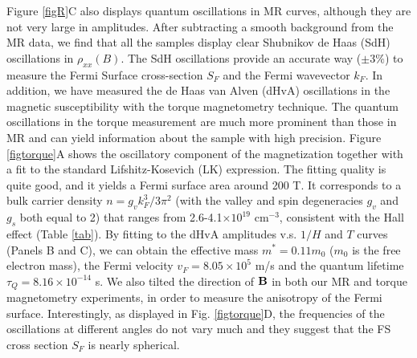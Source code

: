 Figure \ref{figR}C also displays quantum oscillations in MR curves, although they are not very large in amplitudes. After subtracting a smooth background from the MR data, we find that all the samples display clear Shubnikov de Haas (SdH) oscillations in $\rho_{xx}(B)$. The SdH oscillations provide an accurate way ($\pm3\%$) to measure the Fermi Surface cross-section $S_F$ and the Fermi wavevector $k_F$. In addition, we have measured the de Haas van Alven (dHvA) oscillations in the magnetic susceptibility with the torque magnetometry technique. The quantum oscillations in the torque measurement are much more prominent than those in MR and can yield information about the sample with high precision. Figure \ref{figtorque}A shows the oscillatory component of the magnetization together with a fit to the standard Lifshitz-Kosevich (LK) expression. The fitting quality is quite good, and it yields a Fermi surface area around 200 T. It corresponds to a bulk carrier density $n = g_vk_F^3/3\pi^2$ (with the valley and spin degeneracies $g_v$ and $g_s$ both equal to 2) that ranges from 2.6-4.1$\times 10^{19}$ cm$^{-3}$, consistent with the Hall effect (Table \ref{tab}). By fitting to the dHvA amplitudes v.s. $1/H$ and $T$ curves (Panels B and C), we can obtain the effective mass $m^* = 0.11 m_0$ ($m_0$ is the free electron mass),  the Fermi velocity $v_F = 8.05\times10^5$ m/s and the quantum lifetime $\tau_Q=8.16\times10^{-14}$ s. We also tilted the direction of $\bf B$ in both our MR and torque magnetometry experiments, in order to measure the anisotropy of the Fermi surface. Interestingly, as displayed in Fig. \ref{figtorque}D, the frequencies of the oscillations at different angles do not vary much and they suggest that the FS cross section $S_F$ is nearly spherical. 

